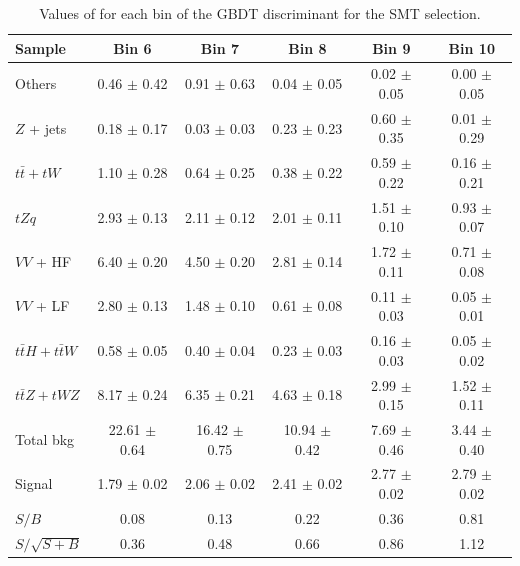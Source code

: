 \begin{table}[!h]
	\centering
	\small
\begin{tabular}{|l|c|c|c|c|c|} 
	\hline 
	Sample 			       & Bin 6            & Bin 7            & Bin 8             & Bin 9           & Bin 10          \\ 
	\hline                 
	Others 			       & 0.46 $\pm$ 0.42  & 0.91  $\pm$ 0.63 & 0.04  $\pm$ 0.05  & 0.02 $\pm$ 0.05 & 0.00 $\pm$ 0.05 \\
	$Z$ + jets             & 0.18 $\pm$ 0.17  & 0.03  $\pm$ 0.03 & 0.23  $\pm$ 0.23  & 0.60 $\pm$ 0.35 & 0.01 $\pm$ 0.29 \\
	$t\bar{t}+tW$          & 1.10 $\pm$ 0.28  & 0.64  $\pm$ 0.25 & 0.38  $\pm$ 0.22  & 0.59 $\pm$ 0.22 & 0.16 $\pm$ 0.21 \\
	$tZq$ 			       & 2.93 $\pm$ 0.13  & 2.11  $\pm$ 0.12 & 2.01  $\pm$ 0.11  & 1.51 $\pm$ 0.10 & 0.93 $\pm$ 0.07 \\
	$VV$ + HF              & 6.40 $\pm$ 0.20  & 4.50  $\pm$ 0.20 & 2.81  $\pm$ 0.14  & 1.72 $\pm$ 0.11 & 0.71 $\pm$ 0.08 
\\ 
	$VV$ + LF              & 2.80 $\pm$ 0.13  & 1.48  $\pm$ 0.10 & 0.61  $\pm$ 0.08  & 0.11 $\pm$ 0.03 & 0.05 $\pm$ 0.01 \\
	$t\bar{t}H+t\bar{t}W$  & 0.58 $\pm$ 0.05  & 0.40  $\pm$ 0.04 & 0.23  $\pm$ 0.03  & 0.16 $\pm$ 0.03 & 0.05 $\pm$ 0.02 \\
	$t\bar{t}Z+tWZ$        & 8.17 $\pm$ 0.24  & 6.35  $\pm$ 0.21 & 4.63  $\pm$ 0.18  & 2.99 $\pm$ 0.15 & 1.52 $\pm$ 0.11 \\
	\hline                   
	Total bkg              & 22.61 $\pm$ 0.64 & 16.42 $\pm$ 0.75 & 10.94 $\pm$ 0.42  & 7.69 $\pm$ 0.46 & 3.44 $\pm$ 0.40 \\
	\hline                   
	Signal                 & 1.79  $\pm$ 0.02 & 2.06  $\pm$ 0.02 & 2.41  $\pm$ 0.02  & 2.77 $\pm$ 0.02 & 2.79 $\pm$ 0.02 \\
	\hline                   
	$S/B$                  & 0.08             & 0.13             & 0.22              & 0.36            & 0.81            \\
	$S/\sqrt{S+B}$         & 0.36             & 0.48             & 0.66              & 0.86            & 1.12         \\
	\hline 
\end{tabular} 
	\caption{Values of \ssplusb for each bin of the GBDT discriminant for the SMT selection.}%
\label{tab:yields:sr3_smt_bdt}
\end{table}

